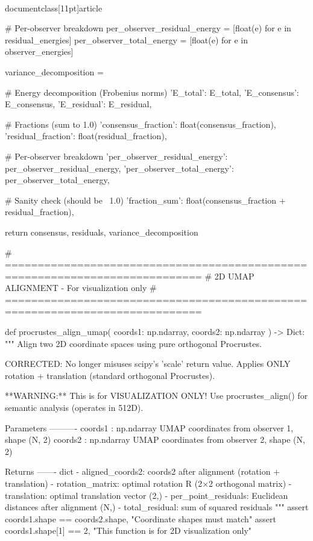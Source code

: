 \\documentclass[11pt]{article}
\begin{document}
\begin{CodeBlock}
    # Per-observer breakdown
    per_observer_residual_energy = [float(e) for e in residual_energies]
    per_observer_total_energy = [float(e) for e in observer_energies]
    
    variance_decomposition = {
        # Energy decomposition (Frobenius norms)
        'E_total': E_total,
        'E_consensus': E_consensus,
        'E_residual': E_residual,
        
        # Fractions (sum to 1.0)
        'consensus_fraction': float(consensus_fraction),
        'residual_fraction': float(residual_fraction),
        
        # Per-observer breakdown
        'per_observer_residual_energy': per_observer_residual_energy,
        'per_observer_total_energy': per_observer_total_energy,
        
        # Sanity check (should be ~1.0)
        'fraction_sum': float(consensus_fraction + residual_fraction),
    }
    
    return consensus, residuals, variance_decomposition


# ============================================================================
# 2D UMAP ALIGNMENT - For visualization only
# ============================================================================

def procrustes_align_umap(
    coords1: np.ndarray,
    coords2: np.ndarray
) -> Dict:
    """
    Align two 2D coordinate spaces using pure orthogonal Procrustes.
    
    CORRECTED: No longer misuses scipy's 'scale' return value.
    Applies ONLY rotation + translation (standard orthogonal Procrustes).
    
    **WARNING:** This is for VISUALIZATION ONLY!
    Use procrustes_align() for semantic analysis (operates in 512D).
    
    Parameters
    ----------
    coords1 : np.ndarray
        UMAP coordinates from observer 1, shape (N, 2)
    coords2 : np.ndarray
        UMAP coordinates from observer 2, shape (N, 2)
    
    Returns
    -------
    dict
        - aligned_coords2: coords2 after alignment (rotation + translation)
        - rotation_matrix: optimal rotation R (2×2 orthogonal matrix)
        - translation: optimal translation vector (2,)
        - per_point_residuals: Euclidean distances after alignment (N,)
        - total_residual: sum of squared residuals
    """
    assert coords1.shape == coords2.shape, "Coordinate shapes must match"
    assert coords1.shape[1] == 2, "This function is for 2D visualization only"
    

\end{CodeBlock}
\end{document}
